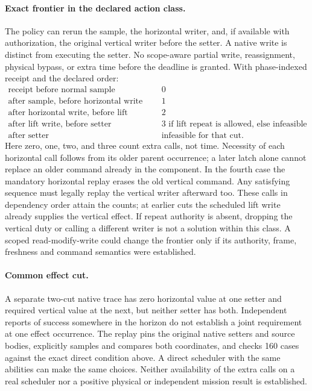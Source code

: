 \documentclass{article}
\begin{document}
\paragraph{Exact frontier in the declared action class.}
The policy can rerun the sample, the horizontal writer, and, if
available with authorization, the original vertical writer before the
setter. A native write is distinct from executing the setter. No
scope-aware partial write, reassignment, physical bypass, or extra
time before the deadline is granted. With phase-indexed receipt and
the declared order:
\[
\begin{array}{lll}
\text{receipt before normal sample} & &0\\
\text{after sample, before horizontal write} &&1\\
\text{after horizontal write, before lift write} &&2\\
\text{after lift write, before setter} &&3\text{ if lift repeat is allowed, else infeasible}\\
\text{after setter} &&\text{infeasible for that cut.}
\end{array}
\]
Here zero, one, two, and three count extra calls, not time.
Necessity of each horizontal call follows from its older parent
occurrence; a later latch alone cannot replace an older command
already in the component. In the fourth case the mandatory
horizontal replay erases the old vertical command. Any satisfying
sequence must legally replay the vertical writer afterward too.
These calls in dependency order attain the counts; at earlier cuts
the scheduled lift write already supplies the vertical effect.
If repeat authority is absent, dropping the vertical duty or
calling a different writer is not a solution within this class.
A scoped read-modify-write could change the frontier only if its
authority, frame, freshness and command semantics were established.

\paragraph{Common effect cut.}
A separate two-cut native trace has zero horizontal value at one
setter and required vertical value at the next, but neither
setter has both. Independent reports of success somewhere in the
horizon do not establish a joint requirement at one effect
occurrence. The replay pins the original native setters and
source bodies, explicitly samples and compares both coordinates,
and checks 160 cases against the exact direct condition above.
A direct scheduler with the same abilities can make the same choices.
Neither availability of the extra calls on a real scheduler nor a
positive physical or independent mission result is established.
\end{document}
